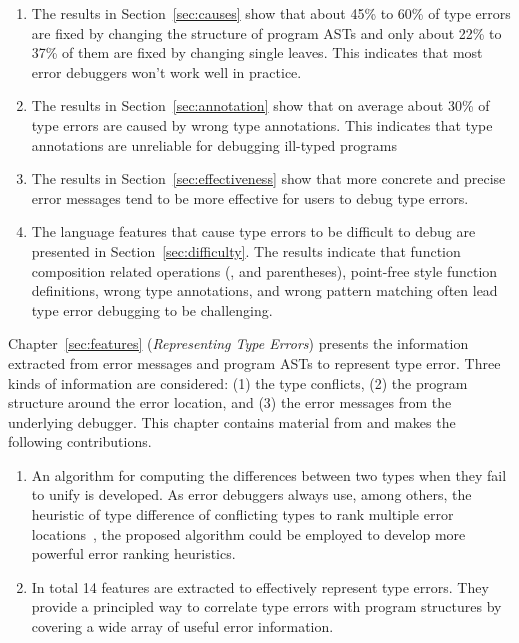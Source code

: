 \documentclass[12pt]{report}	%
\begin{document}
\begin{enumerate}
\item The results in Section~\ref{sec:causes} show that about 45\% to 60\% of type errors are fixed by changing the structure of program ASTs 
and only about 22\% to 37\% of them are fixed by changing single leaves.
This indicates that most error debuggers won't work well in practice.

\item The results in Section~\ref{sec:annotation} show that on average about 30\% of type errors are caused by wrong type annotations.
This indicates that type annotations are unreliable for debugging ill-typed programs

\item The results in Section~\ref{sec:effectiveness} show that more concrete and precise error messages tend to be more effective for users to debug type errors.

\item The language features that cause type errors to be difficult to debug are presented in Section~\ref{sec:difficulty}.
The results indicate that function composition related operations (, \prog{\$} and parentheses),
point-free style function definitions, wrong type annotations, and wrong pattern matching often lead type error debugging to be challenging.
\end{enumerate}

Chapter~\ref{sec:features} (\emph{Representing Type Errors}) presents the information extracted from error messages and program ASTs 
to represent type error. 
Three kinds of information are considered: (1) the type conflicts, (2) the program structure around the error location,
and (3) the error messages from the underlying debugger.
This chapter contains material from \cite{wu2017learning} and makes the following contributions.

\begin{enumerate}
\item An algorithm for computing the differences between two types when they fail to unify is developed.
As error debuggers always use, among others, the heuristic of type difference of conflicting types to rank multiple error locations~\cite{Chen14:CFT,Hage07:HTE},
the proposed algorithm could be employed to develop more powerful error ranking heuristics.

\item In total 14 features are extracted to effectively represent type errors.
They provide a principled way to correlate type errors with program structures by covering a wide array of useful error information.
\end{enumerate}
\end{document}
